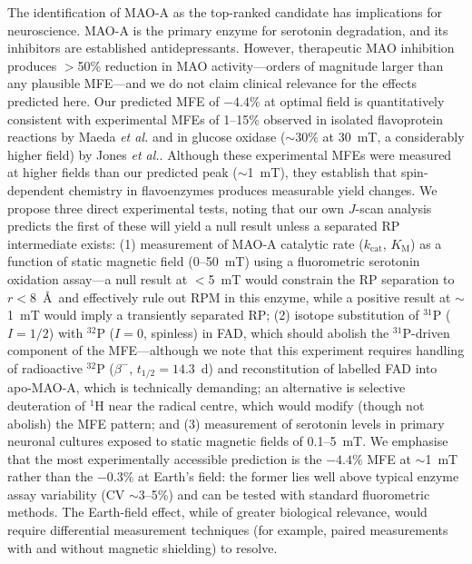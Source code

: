 \documentclass[11pt]{article}
\begin{document}
The identification of MAO-A as the top-ranked candidate has implications for neuroscience. MAO-A is the primary enzyme for serotonin degradation, and its inhibitors are established antidepressants\cite{Youdim2006}. However, therapeutic MAO inhibition produces $>$50\% reduction in MAO activity---orders of magnitude larger than any plausible MFE---and we do not claim clinical relevance for the effects predicted here. Our predicted MFE of $-4.4\%$ at optimal field is quantitatively consistent with experimental MFEs of 1--15\% observed in isolated flavoprotein reactions by Maeda \textit{et al.}\cite{Maeda2012} and in glucose oxidase ($\sim30\%$ at 30~mT, a considerably higher field) by Jones \textit{et al.}\cite{Jones2009}. Although these experimental MFEs were measured at higher fields than our predicted peak ($\sim$1~mT), they establish that spin-dependent chemistry in flavoenzymes produces measurable yield changes. We propose three direct experimental tests, noting that our own $J$-scan analysis predicts the first of these will yield a null result unless a separated RP intermediate exists: (1) measurement of MAO-A catalytic rate ($k_\mathrm{cat}$, $K_\mathrm{M}$) as a function of static magnetic field (0--50~mT) using a fluorometric serotonin oxidation assay---a null result at $<$5~mT would constrain the RP separation to $r < 8$~\AA\ and effectively rule out RPM in this enzyme, while a positive result at $\sim$1~mT would imply a transiently separated RP; (2) isotope substitution of $^{31}$P ($I = 1/2$) with $^{32}$P ($I = 0$, spinless) in FAD, which should abolish the $^{31}$P-driven component of the MFE---although we note that this experiment requires handling of radioactive $^{32}$P ($\beta^-$, $t_{1/2} = 14.3$~d) and reconstitution of labelled FAD into apo-MAO-A, which is technically demanding; an alternative is selective deuteration of $^1$H near the radical centre, which would modify (though not abolish) the MFE pattern; and (3) measurement of serotonin levels in primary neuronal cultures exposed to static magnetic fields of 0.1--5~mT. We emphasise that the most experimentally accessible prediction is the $-4.4\%$ MFE at $\sim$1~mT rather than the $-0.3\%$ at Earth's field: the former lies well above typical enzyme assay variability (CV $\sim$3--5\%) and can be tested with standard fluorometric methods\cite{Ramsay1991}. The Earth-field effect, while of greater biological relevance, would require differential measurement techniques (for example, paired measurements with and without magnetic shielding) to resolve.
\end{document}
